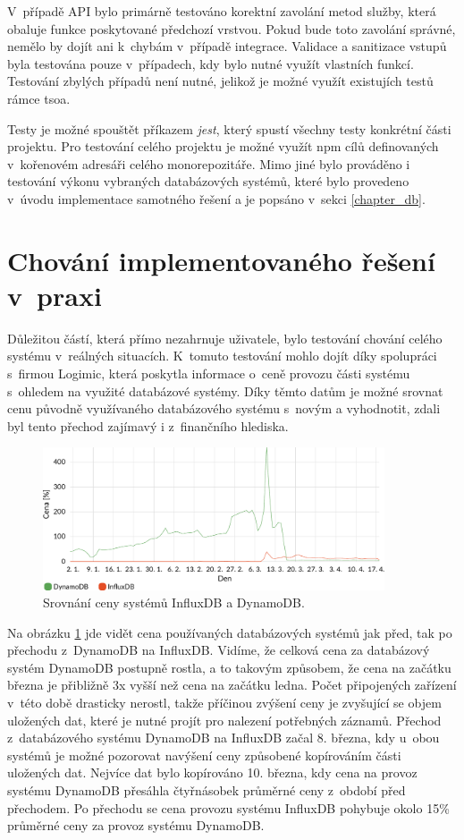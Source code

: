 V~případě API bylo primárně testováno korektní zavolání metod služby, která obaluje funkce poskytované předchozí vrstvou. Pokud bude toto zavolání správné, nemělo by dojít ani k~chybám v~případě integrace. Validace a sanitizace vstupů byla testována pouze v~případech, kdy bylo nutné využít vlastních funkcí. Testování zbylých případů není nutné, jelikož je možné využít existujích testů rámce tsoa.

Testy je možné spouštět příkazem \textit{jest}, který spustí všechny testy konkrétní části projektu. Pro testování celého projektu je možné využít npm cílů definovaných v~kořenovém adresáři celého monorepozitáře. Mimo jiné bylo prováděno i testování výkonu vybraných databázových systémů, které bylo provedeno v~úvodu implementace samotného řešení a je popsáno v~sekci \ref{chapter_db}.

\section{Chování implementovaného řešení v~praxi}
Důležitou částí, která přímo nezahrnuje uživatele, bylo testování chování celého systému v~reálných situacích. K~tomuto testování mohlo dojít díky spolupráci s~firmou Logimic, která poskytla informace o~ceně provozu části systému s~ohledem na využité databázové systémy. Díky těmto datům je možné srovnat cenu původně využívaného databázového systému s~novým a vyhodnotit, zdali byl tento přechod zajímavý i z~finančního hlediska. 

\begin{figure}[H]
\label{cost}
\begin{center}
    \includegraphics[width=0.9\textwidth]{obrazky-figures/cost.pdf}
\end{center}
\caption{Srovnání ceny systémů InfluxDB a DynamoDB.}
\end{figure}

Na obrázku \ref{cost} jde vidět cena používaných databázových systémů jak před, tak po přechodu z~DynamoDB na InfluxDB. Vidíme, že celková cena za databázový systém DynamoDB postupně rostla, a to takovým způsobem, že cena na začátku března je přibližně 3x vyšší než cena na začátku ledna. Počet připojených zařízení v~této době drasticky nerostl, takže příčinou zvýšení ceny je zvyšující se objem uložených dat, které je nutné projít pro nalezení potřebných záznamů. Přechod z~databázového systému DynamoDB na InfluxDB začal 8. března, kdy u~obou systémů je možné pozorovat navýšení ceny způsobené kopírováním části uložených dat. Nejvíce dat bylo kopírováno 10. března, kdy cena na provoz systému DynamoDB přesáhla čtyřnásobek průměrné ceny z~období před přechodem. Po přechodu se cena provozu systému InfluxDB pohybuje okolo 15\% průměrné ceny za provoz systému DynamoDB. 

